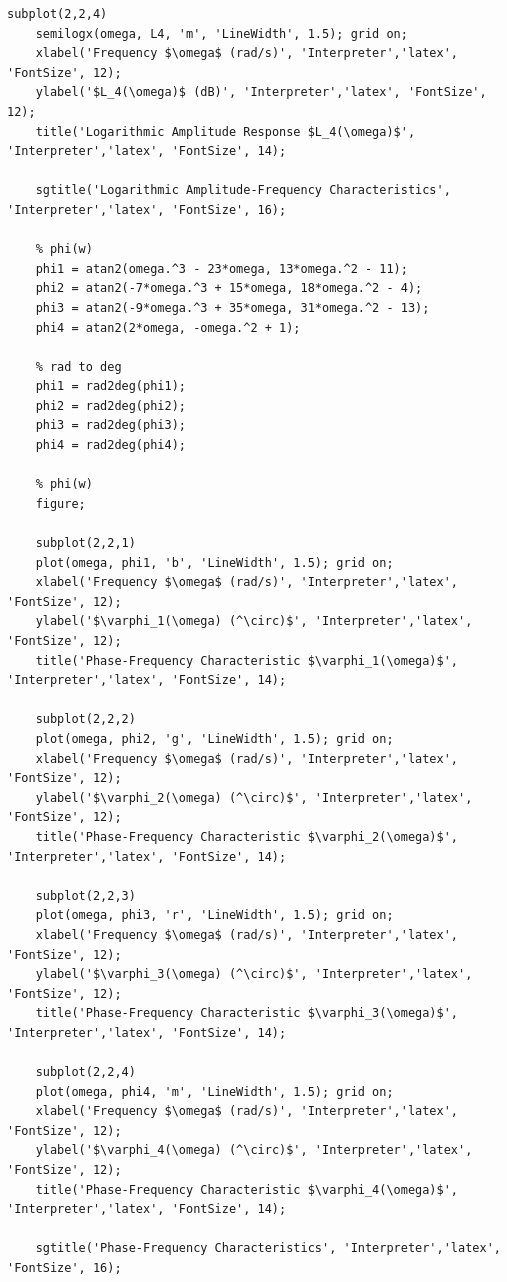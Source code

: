 \documentclass[a4paper, 12pt]{article}
\begin{document}
\begin{lstlisting}[label=task1, caption={Программа для задания 1}]
    subplot(2,2,4)
    semilogx(omega, L4, 'm', 'LineWidth', 1.5); grid on;
    xlabel('Frequency $\omega$ (rad/s)', 'Interpreter','latex', 'FontSize', 12);
    ylabel('$L_4(\omega)$ (dB)', 'Interpreter','latex', 'FontSize', 12);
    title('Logarithmic Amplitude Response $L_4(\omega)$', 'Interpreter','latex', 'FontSize', 14);

    sgtitle('Logarithmic Amplitude-Frequency Characteristics', 'Interpreter','latex', 'FontSize', 16);

    % phi(w)
    phi1 = atan2(omega.^3 - 23*omega, 13*omega.^2 - 11);
    phi2 = atan2(-7*omega.^3 + 15*omega, 18*omega.^2 - 4);
    phi3 = atan2(-9*omega.^3 + 35*omega, 31*omega.^2 - 13);
    phi4 = atan2(2*omega, -omega.^2 + 1);

    % rad to deg
    phi1 = rad2deg(phi1);
    phi2 = rad2deg(phi2);
    phi3 = rad2deg(phi3);
    phi4 = rad2deg(phi4);

    % phi(w)
    figure;

    subplot(2,2,1)
    plot(omega, phi1, 'b', 'LineWidth', 1.5); grid on;
    xlabel('Frequency $\omega$ (rad/s)', 'Interpreter','latex', 'FontSize', 12);
    ylabel('$\varphi_1(\omega) (^\circ)$', 'Interpreter','latex', 'FontSize', 12);
    title('Phase-Frequency Characteristic $\varphi_1(\omega)$', 'Interpreter','latex', 'FontSize', 14);

    subplot(2,2,2)
    plot(omega, phi2, 'g', 'LineWidth', 1.5); grid on;
    xlabel('Frequency $\omega$ (rad/s)', 'Interpreter','latex', 'FontSize', 12);
    ylabel('$\varphi_2(\omega) (^\circ)$', 'Interpreter','latex', 'FontSize', 12);
    title('Phase-Frequency Characteristic $\varphi_2(\omega)$', 'Interpreter','latex', 'FontSize', 14);

    subplot(2,2,3)
    plot(omega, phi3, 'r', 'LineWidth', 1.5); grid on;
    xlabel('Frequency $\omega$ (rad/s)', 'Interpreter','latex', 'FontSize', 12);
    ylabel('$\varphi_3(\omega) (^\circ)$', 'Interpreter','latex', 'FontSize', 12);
    title('Phase-Frequency Characteristic $\varphi_3(\omega)$', 'Interpreter','latex', 'FontSize', 14);

    subplot(2,2,4)
    plot(omega, phi4, 'm', 'LineWidth', 1.5); grid on;
    xlabel('Frequency $\omega$ (rad/s)', 'Interpreter','latex', 'FontSize', 12);
    ylabel('$\varphi_4(\omega) (^\circ)$', 'Interpreter','latex', 'FontSize', 12);
    title('Phase-Frequency Characteristic $\varphi_4(\omega)$', 'Interpreter','latex', 'FontSize', 14);

    sgtitle('Phase-Frequency Characteristics', 'Interpreter','latex', 'FontSize', 16);


\end{lstlisting}
\end{document}
